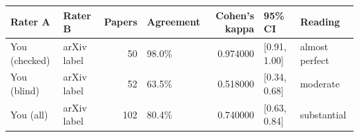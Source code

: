 \begin{tabular}{llrlrll}
\toprule
Rater A & Rater B & Papers & Agreement & Cohen's kappa & 95\% CI & Reading \\
\midrule
You (checked) & arXiv label & 50 & 98.0\% & 0.974000 & [0.91, 1.00] & almost perfect \\
You (blind) & arXiv label & 52 & 63.5\% & 0.518000 & [0.34, 0.68] & moderate \\
You (all) & arXiv label & 102 & 80.4\% & 0.740000 & [0.63, 0.84] & substantial \\
\bottomrule
\end{tabular}
